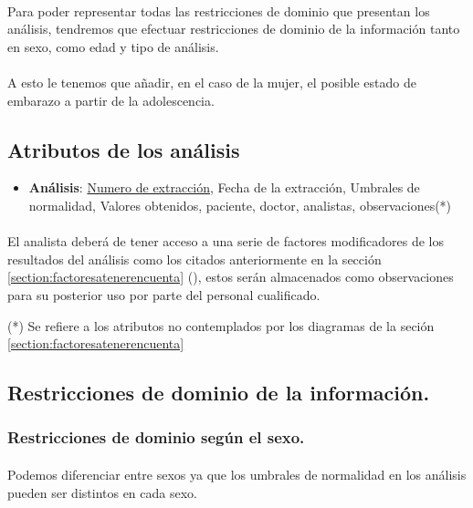 \documentclass[a4paper,10pt]{article}
\begin{document}
\paragraph{}
Para poder representar todas las restricciones de dominio que presentan los análisis, tendremos que efectuar restricciones de dominio de la información tanto en sexo, como edad y tipo de análisis.
\paragraph{}
A esto le tenemos que añadir, en el caso de la mujer, el posible estado de embarazo a partir de la adolescencia.
\subsection{Atributos de los análisis}
\begin{itemize}
	\item {\bf Análisis}: \underline{Numero de extracción}, Fecha de la extracción, Umbrales de normalidad, Valores obtenidos, paciente, doctor, analistas, observaciones(*)
\end{itemize}

\paragraph{}
El analista deberá de tener acceso a una serie de factores modificadores de los resultados del análisis como los citados anteriormente en la sección
\ref{section:factoresatenerencuenta} (), estos serán almacenados como observaciones para su posterior uso por parte del personal cualificado.
\vfill
\begin{flushright}
	
	\small
	(*) Se refiere a los atributos no contemplados por los diagramas de la seción \ref{section:factoresatenerencuenta}
\end{flushright}

\pagebreak
\subsection{Restricciones de dominio de la información.}
\subsubsection{Restricciones de dominio según el sexo.}
\paragraph{}
Podemos diferenciar entre sexos ya que los umbrales de normalidad en los análisis pueden ser distintos en cada sexo.
\end{document}
